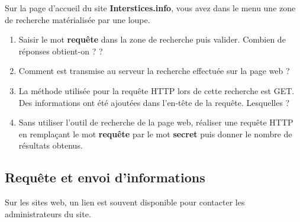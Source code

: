 \documentclass[12pt,a4paper]{article}
\begin{document}

Sur la page d'accueil du site \textbf{Interstices.info}, vous avez dans le menu une zone de recherche matérialisée par une loupe.\medskip

\begin{enumerate}
\item Saisir le mot \textbf{requête} dans la zone de recherche puis valider. Combien de réponses obtient-on ? \vspace{1cm} ?

\item Comment est transmise au serveur la recherche effectuée sur la page web ? \vspace{1cm}


\newpage
\item La méthode utilisée pour la requête HTTP lors de cette recherche est \textsf{GET}. Des informations ont été ajoutées dans l'en-tête de la requête. Lesquelles ? \vspace{2cm}



\item Sans utiliser l'outil de recherche de la page web, réaliser une requête HTTP en remplaçant le mot \textbf{requête} par le mot \textbf{secret} puis donner le nombre de résultats obtenus. \vspace{2cm}



\end{enumerate}

\subsection*{Requête et envoi d'informations}

Sur les sites web, un lien est souvent disponible pour contacter les administrateurs du site.
\end{document}
